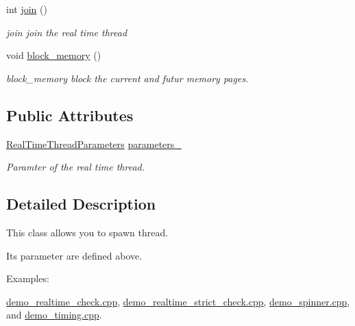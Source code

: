 \begin{DoxyCompactItemize}
int \hyperlink{classreal__time__tools_1_1RealTimeThread_a2f455db9fd80b81e5e69cd22e8529979}{join} ()
\begin{DoxyCompactList}\small\item\em join join the real time thread \end{DoxyCompactList}\item 
void \hyperlink{classreal__time__tools_1_1RealTimeThread_a704b245872cc7bc49e01181f09732535}{block\+\_\+memory} ()
\begin{DoxyCompactList}\small\item\em block\+\_\+memory block the current and futur memory pages. \end{DoxyCompactList}\end{DoxyCompactItemize}
\subsection*{Public Attributes}
\begin{DoxyCompactItemize}
\item 
\mbox{\label{classreal__time__tools_1_1RealTimeThread_aa15b5633e76ea6b4c31cd74b3968686a}} 
\hyperlink{classreal__time__tools_1_1RealTimeThreadParameters}{Real\+Time\+Thread\+Parameters} \hyperlink{classreal__time__tools_1_1RealTimeThread_aa15b5633e76ea6b4c31cd74b3968686a}{parameters\+\_\+}
\begin{DoxyCompactList}\small\item\em Paramter of the real time thread. \end{DoxyCompactList}\end{DoxyCompactItemize}


\subsection{Detailed Description}
This class allows you to spawn thread. 

Its parameter are defined above. \begin{Desc}
\item[Examples\+: ]\par
\hyperlink{demo_realtime_check_8cpp-example}{demo\+\_\+realtime\+\_\+check.\+cpp}, \hyperlink{demo_realtime_strict_check_8cpp-example}{demo\+\_\+realtime\+\_\+strict\+\_\+check.\+cpp}, \hyperlink{demo_spinner_8cpp-example}{demo\+\_\+spinner.\+cpp}, and \hyperlink{demo_timing_8cpp-example}{demo\+\_\+timing.\+cpp}.\end{Desc}


